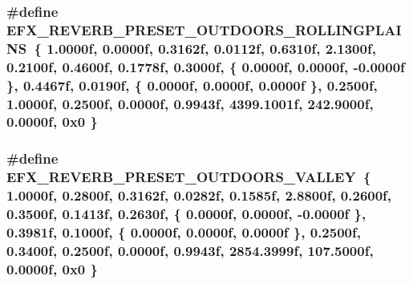 \subsubsection[{\texorpdfstring{E\+F\+X\+\_\+\+R\+E\+V\+E\+R\+B\+\_\+\+P\+R\+E\+S\+E\+T\+\_\+\+O\+U\+T\+D\+O\+O\+R\+S\+\_\+\+R\+O\+L\+L\+I\+N\+G\+P\+L\+A\+I\+NS}{EFX_REVERB_PRESET_OUTDOORS_ROLLINGPLAINS}}]{\setlength{\rightskip}{0pt plus 5cm}\#define E\+F\+X\+\_\+\+R\+E\+V\+E\+R\+B\+\_\+\+P\+R\+E\+S\+E\+T\+\_\+\+O\+U\+T\+D\+O\+O\+R\+S\+\_\+\+R\+O\+L\+L\+I\+N\+G\+P\+L\+A\+I\+NS~\{ 1.\+0000f, 0.\+0000f, 0.\+3162f, 0.\+0112f, 0.\+6310f, 2.\+1300f, 0.\+2100f, 0.\+4600f, 0.\+1778f, 0.\+3000f, \{ 0.\+0000f, 0.\+0000f, -\/0.\+0000f \}, 0.\+4467f, 0.\+0190f, \{ 0.\+0000f, 0.\+0000f, 0.\+0000f \}, 0.\+2500f, 1.\+0000f, 0.\+2500f, 0.\+0000f, 0.\+9943f, 4399.\+1001f, 242.\+9000f, 0.\+0000f, 0x0 \}}\hypertarget{efx-presets_8h_a86ac4258810f51d3891fe40f771217e6}{}\label{efx-presets_8h_a86ac4258810f51d3891fe40f771217e6}
\subsubsection[{\texorpdfstring{E\+F\+X\+\_\+\+R\+E\+V\+E\+R\+B\+\_\+\+P\+R\+E\+S\+E\+T\+\_\+\+O\+U\+T\+D\+O\+O\+R\+S\+\_\+\+V\+A\+L\+L\+EY}{EFX_REVERB_PRESET_OUTDOORS_VALLEY}}]{\setlength{\rightskip}{0pt plus 5cm}\#define E\+F\+X\+\_\+\+R\+E\+V\+E\+R\+B\+\_\+\+P\+R\+E\+S\+E\+T\+\_\+\+O\+U\+T\+D\+O\+O\+R\+S\+\_\+\+V\+A\+L\+L\+EY~\{ 1.\+0000f, 0.\+2800f, 0.\+3162f, 0.\+0282f, 0.\+1585f, 2.\+8800f, 0.\+2600f, 0.\+3500f, 0.\+1413f, 0.\+2630f, \{ 0.\+0000f, 0.\+0000f, -\/0.\+0000f \}, 0.\+3981f, 0.\+1000f, \{ 0.\+0000f, 0.\+0000f, 0.\+0000f \}, 0.\+2500f, 0.\+3400f, 0.\+2500f, 0.\+0000f, 0.\+9943f, 2854.\+3999f, 107.\+5000f, 0.\+0000f, 0x0 \}}\hypertarget{efx-presets_8h_afb3c0613ee957fd34d407431712c9526}{}\label{efx-presets_8h_afb3c0613ee957fd34d407431712c9526}
